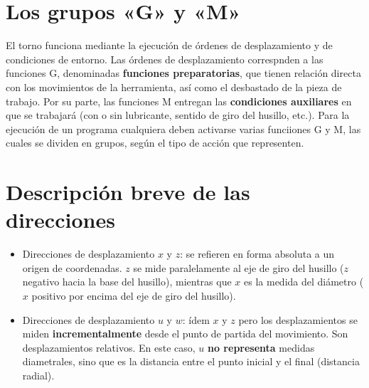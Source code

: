 \documentclass{article}
\begin{document}
\section{Los grupos «G» y «M»}

El torno funciona mediante la ejecución de órdenes de desplazamiento y de
condiciones de entorno. Las órdenes de desplazamiento correspnden a las
funciones G, denominadas \textbf{funciones preparatorias}, que tienen relación
directa con los movimientos de la herramienta, así como el desbastado de la
pieza de trabajo. Por su parte, las funciones M entregan las
\textbf{condiciones auxiliares} en que se trabajará (con o sin lubricante,
sentido de giro del husillo, etc.). Para la ejecución de un programa cualquiera
deben activarse varias funciiones G y M, las cuales se dividen en grupos, según
el tipo de acción que representen.

\section{Descripción breve de las direcciones}

\begin{itemize}
    \item Direcciones de desplazamiento $x$ y $z$: se refieren en forma absoluta a un
          origen de coordenadas. $z$ se mide paralelamente al eje de giro del husillo
          ($z$ negativo hacia la base del husillo), mientras que $x$ es la medida del
          diámetro ($x$ positivo por encima del eje de giro del husillo).

    \item Direcciones de desplazamiento $u$ y $w$: ídem $x$ y $z$ pero los
          desplazamientos se miden \textbf{incrementalmente} desde el punto de partida
          del movimiento. Son desplazamientos relativos. En este caso, $u$ \textbf{no
              representa} medidas diametrales, sino que es la distancia entre el punto
          inicial y el final (distancia radial).
\end{itemize}

\begin{center}
\end{center}
\end{document}
